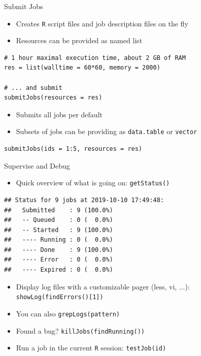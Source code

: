 \documentclass[11pt,compress,t,notes=noshow, aspectratio=169, xcolor=table]{beamer}
\begin{document}
\begin{frame}[fragile]{Submit Jobs}
  \begin{itemize}
    \item Creates \texttt{R} script files and job description files on the fly
    \item Resources can be provided as named list
  \end{itemize}
  
\begin{lstlisting}
# 1 hour maximal execution time, about 2 GB of RAM
res = list(walltime = 60*60, memory = 2000)

# ... and submit
submitJobs(resources = res)
\end{lstlisting}
  
  \begin{itemize}
    \item Submits all jobs per default
    \item Subsets of jobs can be providing as \texttt{data.table} or \texttt{vector}
  \end{itemize}
  
\begin{lstlisting}
submitJobs(ids = 1:5, resources = res)
\end{lstlisting}
  
\end{frame}

\begin{frame}[fragile]{Supervise and Debug}
  \begin{itemize}
    \item Quick overview of what is going on: \texttt{getStatus()}
  \end{itemize}
  \tiny
\begin{lstlisting}
## Status for 9 jobs at 2019-10-10 17:49:48:
##   Submitted    : 9 (100.0%)
##   -- Queued    : 0 (  0.0%)
##   -- Started   : 9 (100.0%)
##   ---- Running : 0 (  0.0%)
##   ---- Done    : 9 (100.0%)
##   ---- Error   : 0 (  0.0%)
##   ---- Expired : 0 (  0.0%)
\end{lstlisting}
  
  \begin{itemize}
    \item Display log files with a customizable pager (less, vi, ...): \texttt{showLog(findErrors()[1])}
    \item You can also \texttt{grepLogs(pattern)}
    \item Found a bug? \texttt{killJobs(findRunning())}
    \item Run a job in the current \texttt{R} session: \texttt{testJob(id)}
  \end{itemize}
\end{frame}
\end{document}
